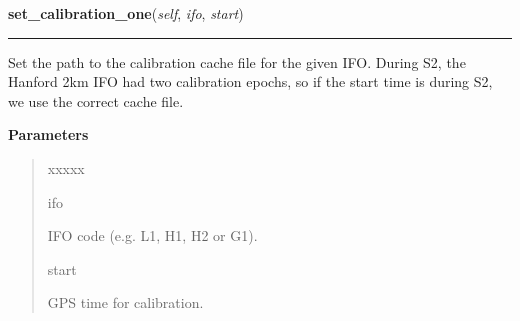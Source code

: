     \label{stochastic:StochasticNode:set_calibration_one}
    \vspace{0.5ex}

    \begin{boxedminipage}{\textwidth}

    \raggedright \textbf{set\_calibration\_one}(\textit{self}, \textit{ifo}, \textit{start})

    \vspace{-1.5ex}

    \rule{\textwidth}{0.5\fboxrule}
    Set the path to the calibration cache file for the given IFO. During 
    S2, the Hanford 2km IFO had two calibration epochs, so if the start 
    time is during S2, we use the correct cache file.

    \vspace{1ex}

      \textbf{Parameters}
      \begin{quote}
        \begin{Ventry}{xxxxx}

          \item[ifo]

          IFO code (e.g. L1, H1, H2 or G1).

          \item[start]

          GPS time for calibration.

        \end{Ventry}

      \end{quote}

    \vspace{1ex}

    \end{boxedminipage}

    \label{stochastic:StochasticNode:set_calibration_two}
    \vspace{0.5ex}

